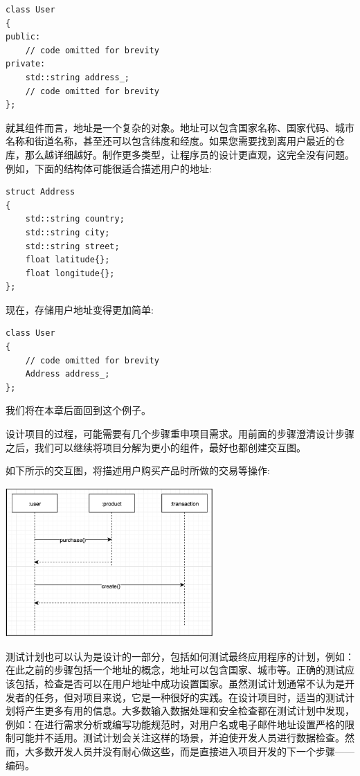 \begin{lstlisting}[caption={}]
class User
{
public:
	// code omitted for brevity
private:
	std::string address_;
	// code omitted for brevity
};
\end{lstlisting}

就其组件而言，地址是一个复杂的对象。地址可以包含国家名称、国家代码、城市名称和街道名称，甚至还可以包含纬度和经度。如果您需要找到离用户最近的仓库，那么越详细越好。制作更多类型，让程序员的设计更直观，这完全没有问题。例如，下面的结构体可能很适合描述用户的地址: \par

\begin{lstlisting}[caption={}]
struct Address
{
	std::string country;
	std::string city;
	std::string street;
	float latitude{};
	float longitude{};
};
\end{lstlisting}

现在，存储用户地址变得更加简单: \par

\begin{lstlisting}[caption={}]
class User
{
	// code omitted for brevity
	Address address_;
};
\end{lstlisting}
我们将在本章后面回到这个例子。 \par
设计项目的过程，可能需要有几个步骤重申项目需求。用前面的步骤澄清设计步骤之后，我们可以继续将项目分解为更小的组件，最好也都创建交互图。 \par
如下所示的交互图，将描述用户购买产品时所做的交易等操作: \par

\begin{center}
	\includegraphics[width=0.6\textwidth]{content/Section-2/Chapter-10/3}
\end{center}

测试计划也可以认为是设计的一部分，包括如何测试最终应用程序的计划，例如：在此之前的步骤包括一个地址的概念，地址可以包含国家、城市等。正确的测试应该包括，检查是否可以在用户地址中成功设置国家。虽然测试计划通常不认为是开发者的任务，但对项目来说，它是一种很好的实践。在设计项目时，适当的测试计划将产生更多有用的信息。大多数输入数据处理和安全检查都在测试计划中发现，例如：在进行需求分析或编写功能规范时，对用户名或电子邮件地址设置严格的限制可能并不适用。测试计划会关注这样的场景，并迫使开发人员进行数据检查。然而，大多数开发人员并没有耐心做这些，而是直接进入项目开发的下一个步骤——编码。 \par

